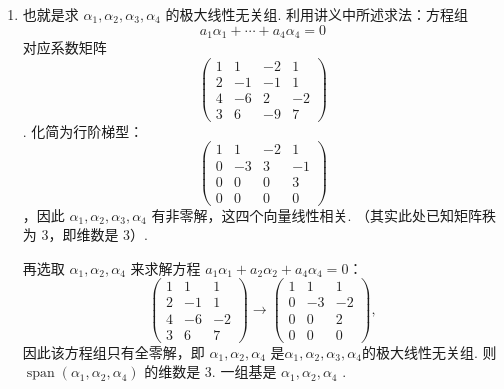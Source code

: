 \documentclass[12pt,fontset=fandol]{ctexart}
\begin{document}
\begin{solve}
\begin{enumerate}
                \item 也就是求 $\alpha_1,\alpha_2,\alpha_3,\alpha_4$ 的极大线性无关组. 利用讲义中所述求法：方程组
                      \[ a_1\alpha_1+\cdots+a_4\alpha_4=0 \]
                      对应系数矩阵 
\[\begin{pmatrix}
                              1 & 1  & -2 & 1  \\
                              2 & -1 & -1 & 1  \\
                              4 & -6 & 2  & -2 \\
                              3 & 6  & -9 & 7\end{pmatrix}\]
. 化简为行阶梯型：
\[\begin{pmatrix}
                              1 & 1  & -2 & 1  \\
                              0 & -3 & 3  & -1 \\
                              0 & 0  & 0  & 3  \\
                              0 & 0  & 0  & 0\end{pmatrix}\]
，因此 $\alpha_1,\alpha_2,\alpha_3,\alpha_4$ 有非零解，这四个向量线性相关. （其实此处已知矩阵秩为 3，即维数是 3）.

                      再选取 $\alpha_1,\alpha_2,\alpha_4$ 来求解方程 $a_1\alpha_1+a_2\alpha_2+a_4\alpha_4=0$：
                      \[\begin{pmatrix}
                              1 & 1  & 1  \\
                              2 & -1 & 1  \\
                              4 & -6 & -2 \\
                              3 & 6  & 7\end{pmatrix}\rightarrow\begin{pmatrix}
                              1 & 1  & 1  \\
                              0 & -3 & -2 \\
                              0 & 0  & 2  \\
                              0 & 0  & 0\end{pmatrix},\]
                      因此该方程组只有全零解，即 $\alpha_1,\alpha_2,\alpha_4$ 是$\alpha_1,\alpha_2,\alpha_3,\alpha_4$的极大线性无关组. 则 $\operatorname{span}(\alpha_1,\alpha_2,\alpha_4)$ 的维数是 3. 一组基是 $\alpha_1,\alpha_2,\alpha_4$ .


\end{enumerate}
\end{solve}
\end{document}
